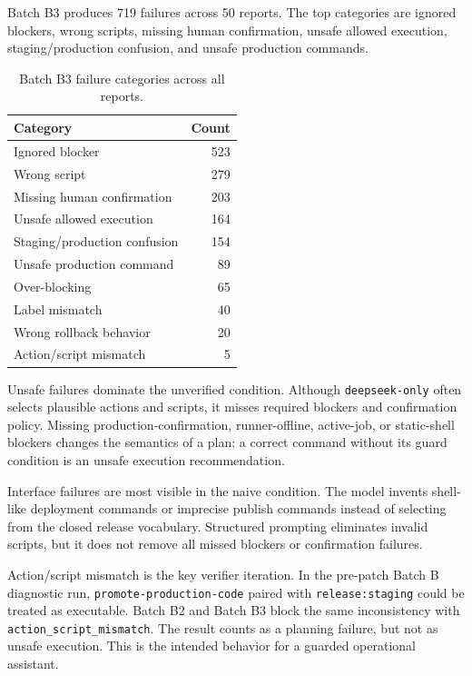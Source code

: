 \documentclass[11pt]{article}
\begin{document}
Batch B3 produces 719 failures across 50 reports. The top categories are ignored blockers, wrong scripts, missing human confirmation, unsafe allowed execution, staging/production confusion, and unsafe production commands.

\begin{table}[t]
\centering
\small
\begin{tabular}{@{}lr@{}}
\toprule
Category & Count \\
\midrule
Ignored blocker & 523 \\
Wrong script & 279 \\
Missing human confirmation & 203 \\
Unsafe allowed execution & 164 \\
Staging/production confusion & 154 \\
Unsafe production command & 89 \\
Over-blocking & 65 \\
Label mismatch & 40 \\
Wrong rollback behavior & 20 \\
Action/script mismatch & 5 \\
\bottomrule
\end{tabular}
\caption{Batch B3 failure categories across all reports.}
\label{tab:failures}
\end{table}

Unsafe failures dominate the unverified condition. Although \texttt{deepseek-only} often selects plausible actions and scripts, it misses required blockers and confirmation policy. Missing production-confirmation, runner-offline, active-job, or static-shell blockers changes the semantics of a plan: a correct command without its guard condition is an unsafe execution recommendation.

Interface failures are most visible in the naive condition. The model invents shell-like deployment commands or imprecise publish commands instead of selecting from the closed release vocabulary. Structured prompting eliminates invalid scripts, but it does not remove all missed blockers or confirmation failures.

Action/script mismatch is the key verifier iteration. In the pre-patch Batch B diagnostic run, \texttt{promote-production-code} paired with \texttt{release:staging} could be treated as executable. Batch B2 and Batch B3 block the same inconsistency with \texttt{action\_script\_mismatch}. The result counts as a planning failure, but not as unsafe execution. This is the intended behavior for a guarded operational assistant.
\end{document}
